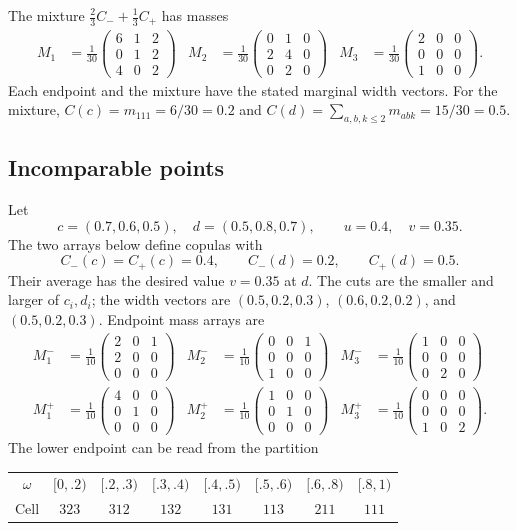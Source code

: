 \documentclass[a4paper,11pt]{amsart}
\numberwithin{equation}{section}
\theoremstyle{definition}
\theoremstyle{remark}
\newcommand{\mat}[1]{\begin{pmatrix}#1\end{pmatrix}}
\begin{document}
The mixture $\tfrac23C_-+\tfrac13C_+$ has masses
\[\begin{aligned}
M_1&=\frac1{30}\mat{6&1&2\\0&1&2\\4&0&2}&
M_2&=\frac1{30}\mat{0&1&0\\2&4&0\\0&2&0}&
M_3&=\frac1{30}\mat{2&0&0\\0&0&0\\1&0&0}.
\end{aligned}\]
Each endpoint and the mixture have the stated marginal width vectors.
For the mixture, $C(c)=m_{111}=6/30=0.2$ and
$C(d)=\sum_{a,b,k\leq2}m_{abk}=15/30=0.5$.

\subsection{Incomparable points}
Let
\[
 c=(0.7,0.6,0.5),\quad d=(0.5,0.8,0.7),\qquad u=0.4,\quad v=0.35.
\]
The two arrays below define copulas with
\[
C_-(c)=C_+(c)=0.4,\qquad C_-(d)=0.2,\qquad C_+(d)=0.5.
\]
Their average has the desired value $v=0.35$ at $d$.
The cuts are the smaller and larger of $c_i,d_i$; the width vectors are
$(0.5,0.2,0.3)$, $(0.6,0.2,0.2)$, and $(0.5,0.2,0.3)$.
Endpoint mass arrays are
\[\begin{aligned}
M^{-}_{1}&=\frac1{10}\mat{2&0&1\\2&0&0\\0&0&0}&
M^{-}_{2}&=\frac1{10}\mat{0&0&1\\0&0&0\\1&0&0}&
M^{-}_{3}&=\frac1{10}\mat{1&0&0\\0&0&0\\0&2&0}\\[5pt]
M^{+}_{1}&=\frac1{10}\mat{4&0&0\\0&1&0\\0&0&0}&
M^{+}_{2}&=\frac1{10}\mat{1&0&0\\0&1&0\\0&0&0}&
M^{+}_{3}&=\frac1{10}\mat{0&0&0\\0&0&0\\1&0&2}.
\end{aligned}\]
The lower endpoint can be read from the partition
\begin{center}\small\setlength{\tabcolsep}{3.6pt}
\begin{tabular}{c@{\quad}ccccccc}
\toprule
$\omega$ & $[0,.2)$ & $[.2,.3)$ & $[.3,.4)$ & $[.4,.5)$ & $[.5,.6)$ & $[.6,.8)$ & $[.8,1)$\\
Cell & $323$ & $312$ & $132$ & $131$ & $113$ & $211$ & $111$\\
\bottomrule
\end{tabular}
\end{center}
\end{document}
